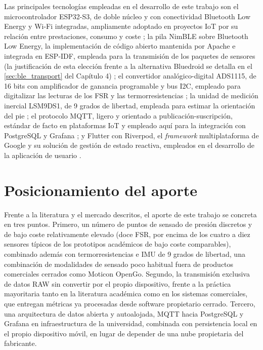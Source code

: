 \begin{IAtext}
Las principales tecnologías empleadas en el desarrollo de este trabajo son el microcontrolador ESP32-S3, de doble núcleo y con conectividad Bluetooth Low Energy y Wi-Fi integradas, ampliamente adoptado en proyectos IoT por su relación entre prestaciones, consumo y coste \cite{esp_idf_docs}; la pila NimBLE sobre Bluetooth Low Energy, la implementación de código abierto mantenida por Apache e integrada en ESP-IDF, empleada para la transmisión de los paquetes de sensores (la justificación de esta elección frente a la alternativa Bluedroid se detalla en el \cref{sec:ble_transport} del Capítulo 4) \cite{nimble_ble}; el convertidor analógico-digital ADS1115, de 16 bits con amplificador de ganancia programable y bus I2C, empleado para digitalizar las lecturas de los FSR y las termorresistencias \cite{ads1115_datasheet}; la unidad de medición inercial LSM9DS1, de 9 grados de libertad, empleada para estimar la orientación del pie \cite{lsm9ds1_datasheet}; el protocolo MQTT, ligero y orientado a publicación-suscripción, estándar de facto en plataformas IoT y empleado aquí para la integración con PostgreSQL y Grafana \cite{mqtt_spec}; y Flutter con Riverpod, el \textit{framework} multiplataforma de Google y su solución de gestión de estado reactiva, empleados en el desarrollo de la aplicación de usuario \cite{flutter_docs}.

\section{Posicionamiento del aporte}

Frente a la literatura y el mercado descritos, el aporte de este trabajo se concreta en tres puntos. Primero, un número de puntos de sensado de presión discretos y de bajo coste relativamente elevado (doce FSR, por encima de los cuatro a diez sensores típicos de los prototipos académicos de bajo coste comparables), combinado además con termorresistencias e IMU de 9 grados de libertad, una combinación de modalidades de sensado poco habitual fuera de productos comerciales cerrados como Moticon OpenGo. Segundo, la transmisión exclusiva de datos RAW sin convertir por el propio dispositivo, frente a la práctica mayoritaria tanto en la literatura académica como en los sistemas comerciales, que entregan métricas ya procesadas desde software propietario cerrado. Tercero, una arquitectura de datos abierta y autoalojada, MQTT hacia PostgreSQL y Grafana en infraestructura de la universidad, combinada con persistencia local en el propio dispositivo móvil, en lugar de depender de una nube propietaria del fabricante.


\end{IAtext}
